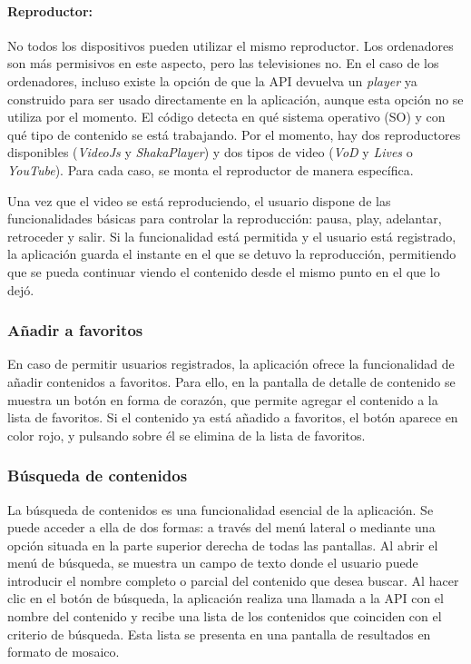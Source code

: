 \paragraph{Reproductor:} No todos los dispositivos pueden utilizar el mismo reproductor. Los ordenadores son más permisivos en este aspecto, pero las televisiones no. En 
el caso de los ordenadores, incluso existe la opción de que la API devuelva un \textit{player} ya construido para ser usado directamente en la aplicación, aunque esta opción no 
se utiliza por el momento. El código detecta en qué sistema operativo (SO) y con qué tipo de contenido se está trabajando. Por el momento, hay dos reproductores disponibles 
(\textit{VideoJs} y \textit{ShakaPlayer}) y dos tipos de video (\textit{VoD} y \textit{Lives} o \textit{YouTube}). Para cada caso, se monta el reproductor de manera específica.

Una vez que el video se está reproduciendo, el usuario dispone de las funcionalidades básicas para controlar la reproducción: pausa, play, adelantar, retroceder y salir. 
Si la funcionalidad está permitida y el usuario está registrado, la aplicación guarda el instante en el que se detuvo la reproducción, permitiendo que se 
pueda continuar viendo el contenido desde el mismo punto en el que lo dejó.

\subsubsection{Añadir a favoritos}
\label{sec:anadir_favoritos}

En caso de permitir usuarios registrados, la aplicación ofrece la funcionalidad de añadir contenidos a favoritos. Para ello, en la pantalla de detalle de contenido 
se muestra un botón en forma de corazón, que permite agregar el contenido a la lista de favoritos. Si el contenido ya está añadido a favoritos, el botón aparece en 
color rojo, y pulsando sobre él se elimina de la lista de favoritos.

\subsubsection{Búsqueda de contenidos}
\label{sec:busqueda_contenidos}

La búsqueda de contenidos es una funcionalidad esencial de la aplicación. Se puede acceder a ella de dos formas: a través del menú lateral o mediante una opción situada 
en la parte superior derecha de todas las pantallas. Al abrir el menú de búsqueda, se muestra un campo de texto donde el usuario puede introducir el nombre completo o 
parcial del contenido que desea buscar. Al hacer clic en el botón de búsqueda, la aplicación realiza una llamada a la API con el nombre del contenido y recibe una lista 
de los contenidos que coinciden con el criterio de búsqueda. Esta lista se presenta en una pantalla de resultados en formato de mosaico.

